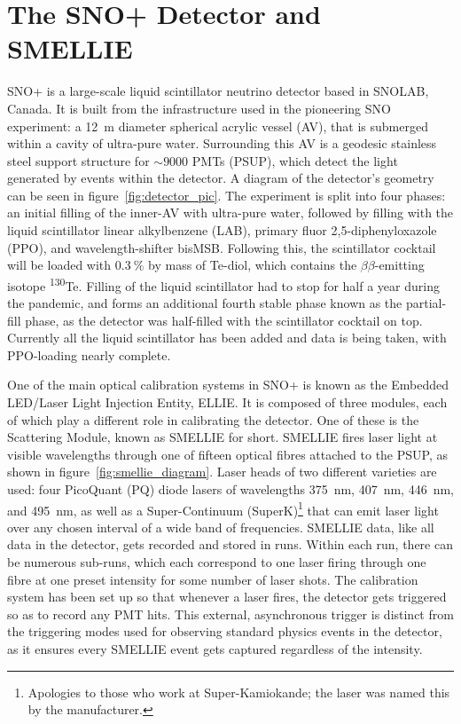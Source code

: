 \section{The SNO+ Detector and SMELLIE}\label{sect:detector}
SNO+ is a large-scale liquid scintillator neutrino detector based in SNOLAB, Canada. It is built from the infrastructure used in the pioneering SNO experiment: a \SI{12}{\metre} diameter spherical acrylic vessel (AV), that is submerged within a cavity of ultra-pure water. Surrounding this AV is a geodesic stainless steel support structure for $\sim\num{9000}$ PMTs (PSUP), which detect the light generated by events within the detector. A diagram of the detector's geometry can be seen in figure~\ref{fig:detector_pic}. The experiment is split into four phases: an initial filling of the inner-AV with ultra-pure water, followed by filling with the liquid scintillator linear alkylbenzene (LAB), primary fluor 2,5-diphenyloxazole (PPO), and wavelength-shifter bisMSB. Following this, the scintillator cocktail will be loaded with $\SI{0.3}{\percent}$ by mass of Te-diol, which contains the $\beta\beta$-emitting isotope \textsuperscript{130}Te. Filling of the liquid scintillator had to stop for half a year during the pandemic, and forms an additional fourth stable phase known as the partial-fill phase, as the detector was half-filled with the scintillator cocktail on top. Currently all the liquid scintillator has been added and data is being taken, with PPO-loading nearly complete.

One of the main optical calibration systems in SNO+ is known as the Embedded LED/Laser Light Injection Entity, ELLIE. It is composed of three modules, each of which play a different role in calibrating the detector. One of these is the Scattering Module, known as SMELLIE for short. SMELLIE fires laser light at visible wavelengths through one of fifteen optical fibres attached to the PSUP, as shown in figure~\ref{fig:smellie_diagram}. Laser heads of two different varieties are used: four PicoQuant (PQ) diode lasers of wavelengths \SI{375}{\nano\metre}, \SI{407}{\nano\metre}, \SI{446}{\nano\metre}, and \SI{495}{\nano\metre}, as well as a Super-Continuum (SuperK)\footnote{Apologies to those who work at Super-Kamiokande; the laser was named this by the manufacturer.} that can emit laser light over any chosen interval of a wide band of frequencies. SMELLIE data, like all data in the detector, gets recorded and stored in runs. Within each run, there can be numerous sub-runs, which each correspond to one laser firing through one fibre at one preset intensity for some number of laser shots. The calibration system has been set up so that whenever a laser fires, the detector gets triggered so as to record any PMT hits. This external, asynchronous trigger is distinct from the triggering modes used for observing standard physics events in the detector, as it ensures every SMELLIE event gets captured regardless of the intensity.

